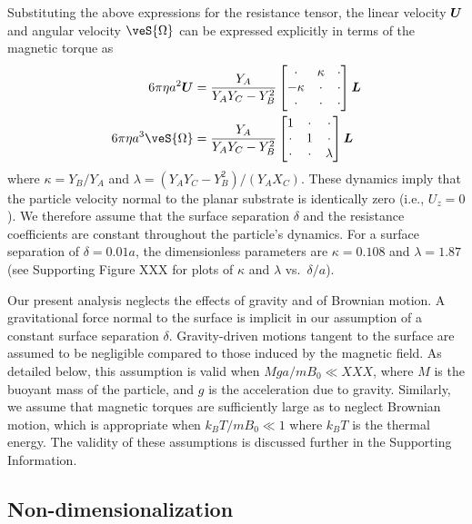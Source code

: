 Substituting the above expressions for the resistance tensor, the linear velocity $\boldsymbol{U}$ and angular velocity $\veS{\Omega}$ can be expressed explicitly in terms of the magnetic torque as
\begin{align}
    6\pi\eta a^2 \ve{U} &= \frac{Y_A}{Y_A Y_C - Y_B^2}\begin{bmatrix} 
        \cdot & \kappa & \cdot \\
        -\kappa & \cdot & \cdot \\
        \cdot & \cdot & \cdot  \end{bmatrix} \ve{L}  \label{eq:U}
    \\
    6\pi\eta a^3 \veS{\Omega} &= \frac{Y_A}{Y_A Y_C - Y_B^2}\begin{bmatrix} 
        1 & \cdot & \cdot \\
        \cdot & 1 & \cdot \\
        \cdot & \cdot & \lambda  \end{bmatrix} \ve{L} \label{eq:W}
\end{align}
where $\kappa = Y_B/Y_A$ and $\lambda=(Y_A Y_C -Y_B^2)/(Y_A X_C)$. These dynamics imply that the particle velocity normal to the planar substrate is identically zero (i.e., $U_z=0$). We therefore assume that the surface separation $\delta$ and the resistance coefficients are constant throughout the particle's dynamics.  For a surface separation of $\delta = 0.01 a$, the dimensionless parameters are $\kappa = 0.108$ and $\lambda=1.87$ (see Supporting Figure XXX for plots of $\kappa$ and $\lambda$ vs.~$\delta/a$).  

Our present analysis neglects the effects of gravity and of Brownian motion. A gravitational force normal to the surface is implicit in our assumption of a constant surface separation $\delta$. Gravity-driven motions tangent to the surface are assumed to be negligible compared to those induced by the magnetic field. As detailed below, this assumption is valid when $M g a / m B_0 \ll XXX$, where $M$ is the buoyant mass of the particle, and $g$ is the acceleration due to gravity. Similarly, we assume that magnetic torques are sufficiently large as to neglect Brownian motion, which is appropriate when $k_B T / m B_0 \ll 1$ where $k_BT$ is the thermal energy. The validity of these assumptions is discussed further in the Supporting Information.

\subsection{Non-dimensionalization}

